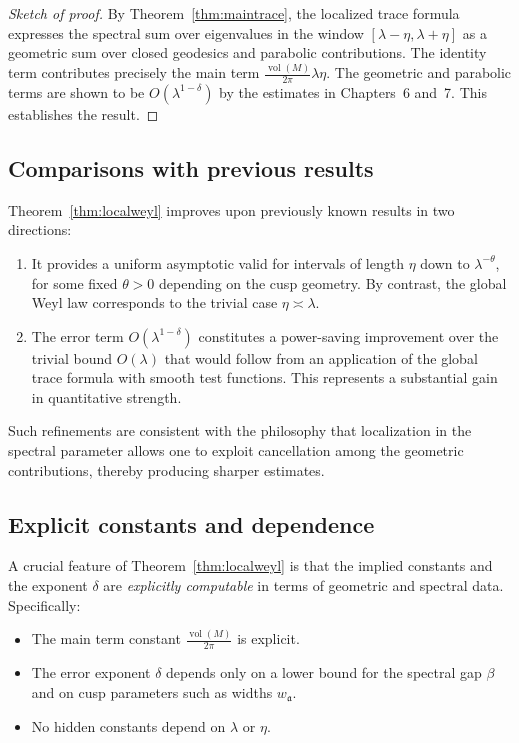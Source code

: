 \begin{proof}[Sketch of proof]
By Theorem~\ref{thm:maintrace}, the localized trace formula expresses the spectral sum over eigenvalues in the window $[\lambda-\eta,\lambda+\eta]$ as a geometric sum over closed geodesics and parabolic contributions. The identity term contributes precisely the main term $\frac{\operatorname{vol}(M)}{2\pi} \lambda \eta$. The geometric and parabolic terms are shown to be $O(\lambda^{1-\delta})$ by the estimates in Chapters~6 and~7. This establishes the result.
\end{proof}

\subsection{Comparisons with previous results}

Theorem~\ref{thm:localweyl} improves upon previously known results in two directions:

\begin{enumerate}
\item It provides a uniform asymptotic valid for intervals of length $\eta$ down to $\lambda^{-\theta}$, for some fixed $\theta > 0$ depending on the cusp geometry. By contrast, the global Weyl law corresponds to the trivial case $\eta \asymp \lambda$.
\item The error term $O(\lambda^{1-\delta})$ constitutes a power-saving improvement over the trivial bound $O(\lambda)$ that would follow from an application of the global trace formula with smooth test functions. This represents a substantial gain in quantitative strength.
\end{enumerate}

Such refinements are consistent with the philosophy that localization in the spectral parameter allows one to exploit cancellation among the geometric contributions, thereby producing sharper estimates.

\subsection{Explicit constants and dependence}

A crucial feature of Theorem~\ref{thm:localweyl} is that the implied constants and the exponent $\delta$ are \emph{explicitly computable} in terms of geometric and spectral data. Specifically:

\begin{itemize}
\item The main term constant $\frac{\operatorname{vol}(M)}{2\pi}$ is explicit.
\item The error exponent $\delta$ depends only on a lower bound for the spectral gap $\beta$ and on cusp parameters such as widths $w_\mathfrak{a}$.
\item No hidden constants depend on $\lambda$ or $\eta$.
\end{itemize}

